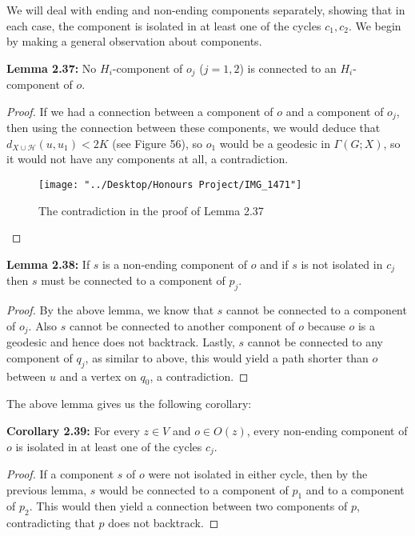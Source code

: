 \documentclass[12pt]{article}
\newcommand{\vs}{\vskip10pt}
\begin{document}
	\vs 
	
	We will deal with ending and non-ending components separately, showing that in each case, the component is isolated in at least one of the cycles $c_1, c_2$. We begin by making a general observation about components.
	
	\vs 
	
	\textbf{Lemma 2.37: } No $H_i$-component of $o_j$ ($j=1,2$) is connected to an $H_i$-component of $o$. 
	
	\begin{proof}
		
		If we had a connection between a component of $o$ and a component of $o_j$, then using the connection between these components, we would deduce that $d_{X \cup \mathcal{H}} (u, u_1) < 2K$ (see Figure 56), so $o_1$ would be a geodesic in $\Gamma(G; X)$, so it would not have any components at all, a contradiction.
		
\begin{figure} [H]
	\centering
	\texttt{[image: "../Desktop/Honours Project/IMG\_1471"]}
	\caption{The contradiction in the proof of Lemma 2.37}
	\label{fig:img1471}
\end{figure}
		
	\end{proof}

	\textbf{Lemma 2.38: } If $s$ is a non-ending component of $o$ and if $s$ is not isolated in $c_j$ then $s$ must be connected to a component of $p_j$. 
	
	\begin{proof}
		
		By the above lemma, we know that $s$ cannot be connected to a component of $o_j$. Also $s$ cannot be connected to another component of $o$ because $o$ is a geodesic and hence does not backtrack. Lastly, $s$ cannot be connected to any component of $q_j$, as similar to above, this would yield a path shorter than $o$ between $u$ and a vertex on $q_0$, a contradiction.
		
	\end{proof}

	The above lemma gives us the following corollary: 
	
	\vs 
	
	\textbf{Corollary 2.39: } For every $z \in V$ and $o \in O(z)$, every non-ending component of $o$ is isolated in at least one of the cycles $c_j$. 
	
	\begin{proof}
		
		If a component $s$ of $o$ were not isolated in either cycle, then by the previous lemma, $s$ would be connected to a component of $p_1$ and to a component of $p_2$. This would then yield a connection between two components of $p$, contradicting that $p$ does not backtrack. 
		
	\end{proof}
\end{document}
